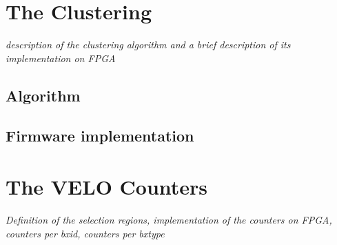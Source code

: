 \section{The Clustering}
\textit{description of the clustering algorithm and a brief description of its implementation on FPGA\\
}
\subsection{Algorithm}
\subsection{Firmware implementation}

\section{The VELO Counters}\label{sec:velo_counters}
\textit{Definition of the selection regions, implementation of the counters on FPGA, counters per bxid, counters per bxtype}



